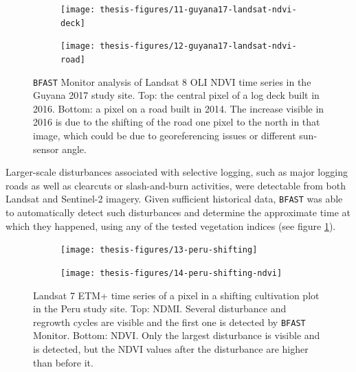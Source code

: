 \documentclass[a4paper,12pt]{scrbook}
\begin{document}
\begin{figure}
  \begin{subfigure}{\textwidth}
    \centering
    \texttt{[image: thesis-figures/11-guyana17-landsat-ndvi-deck]}
  \end{subfigure}
  \begin{subfigure}{\textwidth}
    \centering
    \texttt{[image: thesis-figures/12-guyana17-landsat-ndvi-road]}
  \end{subfigure}
  \caption{\texttt{BFAST} Monitor analysis of Landsat 8 \ac{OLI} \ac{NDVI} time series in the Guyana 2017 study site. Top: the central pixel of a log deck built in 2016. Bottom: a pixel on a road built in 2014. The increase visible in 2016 is due to the shifting of the road one pixel to the north in that image, which could be due to georeferencing issues or different sun-sensor angle.}
  \label{fig-guyana17-landsat-ndvi-deck}
\end{figure}

Larger-scale disturbances associated with selective logging, such as major logging roads as well as clearcuts or slash-and-burn activities, were detectable from both Landsat and Sentinel-2 imagery. Given sufficient historical data, \texttt{BFAST} was able to automatically detect such disturbances and determine the approximate time at which they happened, using any of the tested vegetation indices (see figure \ref{fig-guyana17-landsat-ndvi-deck}).

\begin{figure}
  \begin{subfigure}{\textwidth}
    \centering
    \texttt{[image: thesis-figures/13-peru-shifting]}
  \end{subfigure}
  \begin{subfigure}{\textwidth}
    \centering
    \texttt{[image: thesis-figures/14-peru-shifting-ndvi]}
  \end{subfigure}
  \caption{Landsat 7 \ac{ETM+} time series of a pixel in a shifting cultivation plot in the Peru study site. Top: \ac{NDMI}. Several disturbance and regrowth cycles are visible and the first one is detected by \texttt{BFAST} Monitor. Bottom: \ac{NDVI}. Only the largest disturbance is visible and is detected, but the \ac{NDVI} values after the disturbance are higher than before it.}
  \label{fig-peru-shifting-cultivation}
\end{figure}
\end{document}
